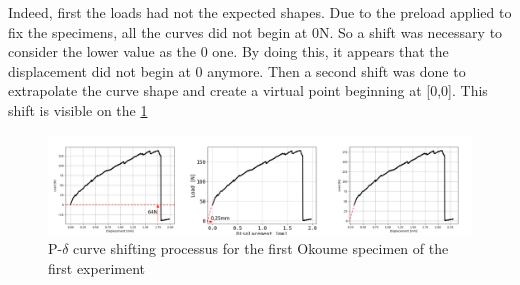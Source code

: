 Indeed, first the loads had not the expected shapes. Due to the preload applied to fix the specimens, all the curves did not begin at 0\si{\newton}. So a shift was necessary to consider the lower value as the 0 one. By doing this, it appears that the displacement did not begin at 0 anymore. Then a second shift was done to extrapolate the curve shape and create a virtual point beginning at [0,0]. This shift is visible on the \ref{fig:Pdel_shift}
\begin{figure}[th]
	\centering
	\includegraphics[width=\textwidth]{Figures/Pdel_shift}
	\caption[P-$\delta$ curve shifting processus]{P-$\delta$ curve shifting processus for the first Okoume specimen of the first experiment}
	\label{fig:Pdel_shift}
\end{figure}

